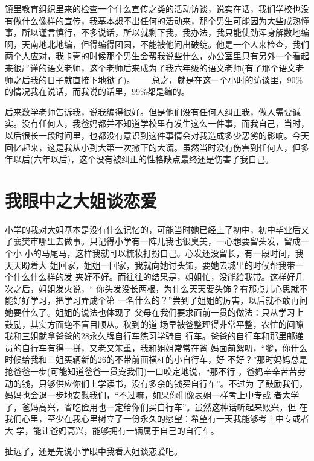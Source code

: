 \documentclass[12pt]{book}
\begin{document}
镇里教育组织里来的检查一个什么宣传之类的活动访谈，说实在话，我们学校也没有做什么像样的宣传，我基本想不出任何的活动来，那个男生可能因为大些成熟懂事，所以谨言慎行，不多说话，所以就剩下我，我办法，我只能使劲浑身解数地编啊，天南地北地编，但得编得团圆，不能被他问出破绽。他是一个人来检查，我们两个人应对，我卡壳的时候那个男生会帮我说些什么，办公室里只有另外一个看起来很严谨的语文老师，这个老师后来成为了我六年级的语文老师(有了那个语文老师之后我的日子就直接下地狱了)。------总之，就是在这一个小时的访谈里，90\%的情况我在说话，而我说的话里，99\%都是编的。

后来数学老师告诉我，说我编得很好。但是他们没有任何人纠正我，做人需要诚实。没有任何人，我爸妈都并不知道学校里有发生这么一件事，而我自己，当时，以后很长一段时间里，也都没有意识到这件事情会对我造成多少恶劣的影响。今天回忆起来，这是我从小到大第一次撒下的大谎。虽然当时没有伤害到任何人，但多年以后(六年以后)，这个没有被纠正的性格缺点最终还是伤害了我自己。
\section{我眼中之大姐谈恋爱}
\label{sec-2-3}

        小学的我对大姐基本是没有什么记忆的，可能当时她已经上了初中，初中毕业后又
了襄樊市哪里去做事。只记得小学有一阵儿我也很臭美，一心想要留头发，留成一个小
小的马尾马，这样我就可以梳妆打扮自己。心发还没留长，有一段时间，我天天盼着大
姐回家，姐姐一回家，我就向她讨头饰，要她去城里的时候帮我带一个什么什么样的发
夹好不好。而往往的结果是，姐姐忙，没能给我带。这样好几次之后，姐姐发火说，“
你头发没长两根，为什么天天要头饰？有那点儿心思就不能好好学习，把学习弄成个第
一名什么的？”尝到了姐姐的厉害，以后就不敢再问她要什么了。姐姐的说法也体现了
父母在我们要求面前一贯的做法：只从学习上鼓励，其实方面绝不盲目顺从。秋到的道
场早被爸整理得非常平整，农忙的间隙我和三姐就拿爸爸的28永久牌自行车练习学骑自
行车。爸爸的自行车和那里邮递员的自行车有得一拼，又老又笨重，我和姐姐常常在爸
妈面前絮叨，“爹，你什么时候给我和三姐买辆新的26的不带前面横杠的小自行车，好
不好？”那时妈妈总是抢爸爸一步(可能知道爸爸一贯宠我们)一口咬定地说，“那不行
，爸妈辛辛苦苦劳动的钱，只够供应你们上学读书，没有多余的钱买自行车”。不过为
了鼓励我们，妈妈也会退一步地安慰我们，“不过嘛，如果你们像表姐一样考上中专或
者大学了，爸妈高兴，省吃俭用也一定给你们买自行车”。虽然这种话听起来败兴，但
在我们心里，至少在我心里树立了一份永久的愿望：希望有一天我能够考上中专或者大
学，能让爸妈高兴，能够拥有一辆属于自己的自行车。

扯远了，还是先说小学眼中我看大姐谈恋爱吧。
\end{document}
